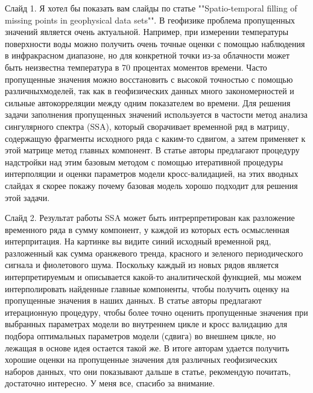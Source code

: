 \documentclass[12pt]{article}
\date{}
\begin{document}
Слайд 1.
Я хотел бы показать вам слайды по статье ""Spatio-temporal filling of missing points in geophysical data sets"". В геофизике проблема пропущенных значений является очень актуальной. Например, при измерении температуры поверхности воды можно получить очень точные оценки с помощью наблюдения в инфракрасном диапазоне, но для конкретной точки из-за облачности может быть неизвестна температура в 70 процентах моментов времени. Часто пропущенные значения можно восстановить с высокой точностью с помощью различныхмоделей, так как в геофизических данных много закономерностей и сильные автокорреляции между одним показателем во времени. Для решения задачи заполнения пропущенных значений используется в частости метод анализа сингулярного спектра (SSA), который сворачивает временной ряд в матрицу, содержащую фрагменты исходного ряда с каким-то сдвигом, а затем применяет к этой матрице метод главных компонент. В статье авторы предлагают процедуру надстройки над этим базовым методом с помощью итеративной процедуры интерполяции и оценки параметров модели кросс-валидацией, на этих вводных слайдах я скорее покажу почему базовая модель хорошо подходит для решения этой задачи.

Слайд 2.
Результат работы SSA может быть интрерпретирован как разложение временного ряда в сумму компонент, у каждой из которых есть осмысленная интерпритация. На картинке вы видите синий исходный временной ряд, разложенный как сумма оранжевого тренда, красного и зеленого периодического сигнала и фиолетового шума. Поскольку каждый из новых рядов является интерпретируемым и описывается какой-то аналитической функцией, мы можем интерполировать найденные главные компоненты, чтобы получить оценку на пропущенные значения в наших данных. В статье авторы предлагают итерационную процедуру, чтобы более точно оценить пропущенные значения при выбранных параметрах модели во внутреннем цикле и кросс валидацию для подбора оптимальных параметров модели (сдвига) во внешнем цикле, но лежащая в основе идея остается такой же. В итоге авторам удается получить хорошие оценки на пропущенные значения для различных геофизических наборов данных, что они показывают дальше в статье, рекомендую почитать, достаточно интересно. У меня все, спасибо за внимание.
\end{document}
